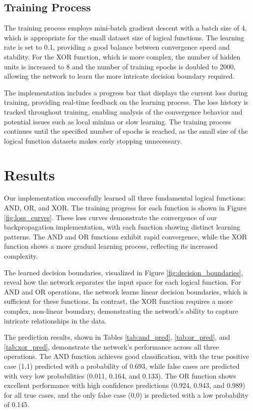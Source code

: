 \documentclass[11pt,a4paper]{article}
\begin{document}
\subsection{Training Process}
The training process employs mini-batch gradient descent with a batch size of 4, which is appropriate for the small dataset size of logical functions. The learning rate is set to 0.1, providing a good balance between convergence speed and stability. For the XOR function, which is more complex, the number of hidden units is increased to 8 and the number of training epochs is doubled to 2000, allowing the network to learn the more intricate decision boundary required.

The implementation includes a progress bar that displays the current loss during training, providing real-time feedback on the learning process. The loss history is tracked throughout training, enabling analysis of the convergence behavior and potential issues such as local minima or slow learning. The training process continues until the specified number of epochs is reached, as the small size of the logical function datasets makes early stopping unnecessary.

\section{Results}
\label{sec:results}
Our implementation successfully learned all three fundamental logical functions: AND, OR, and XOR. The training progress for each function is shown in Figure \ref{fig:loss_curves}. These loss curves demonstrate the convergence of our backpropagation implementation, with each function showing distinct learning patterns. The AND and OR functions exhibit rapid convergence, while the XOR function shows a more gradual learning process, reflecting its increased complexity.

The learned decision boundaries, visualized in Figure \ref{fig:decision_boundaries}, reveal how the network separates the input space for each logical function. For AND and OR operations, the network learns linear decision boundaries, which is sufficient for these functions. In contrast, the XOR function requires a more complex, non-linear boundary, demonstrating the network's ability to capture intricate relationships in the data.

The prediction results, shown in Tables \ref{tab:and_pred}, \ref{tab:or_pred}, and \ref{tab:xor_pred}, demonstrate the network's performance across all three operations. The AND function achieves good classification, with the true positive case (1,1) predicted with a probability of 0.693, while false cases are predicted with very low probabilities (0.011, 0.164, and 0.133). The OR function shows excellent performance with high confidence predictions (0.924, 0.943, and 0.989) for all true cases, and the only false case (0,0) is predicted with a low probability of 0.145.
\end{document}
